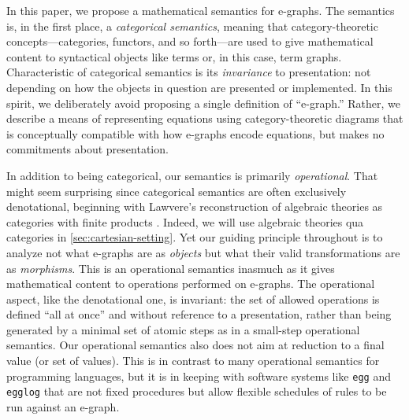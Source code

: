 \documentclass[11pt]{article}
\numberwithin{equation}{section}
\begin{document}
In this paper, we propose a mathematical semantics for e-graphs. The semantics
is, in the first place, a \emph{categorical semantics}, meaning that
category-theoretic concepts---categories, functors, and so forth---are used to
give mathematical content to syntactical objects like terms or, in this case,
term graphs. Characteristic of categorical semantics is its \emph{invariance} to
presentation: not depending on how the objects in question are presented or
implemented. In this spirit, we deliberately avoid proposing a single definition
of ``e-graph.'' Rather, we describe a means of representing equations using
category-theoretic diagrams that is conceptually compatible with how e-graphs
encode equations, but makes no commitments about presentation.

In addition to being categorical, our semantics is primarily \emph{operational}.
That might seem surprising since categorical semantics are often exclusively
denotational, beginning with Lawvere's reconstruction of algebraic theories as
categories with finite products \cite{lawvere1963,crole1993,adamek2011}. Indeed,
we will use algebraic theories qua categories in \cref{sec:cartesian-setting}.
Yet our guiding principle throughout is to analyze not what e-graphs are as
\emph{objects} but what their valid transformations are as \emph{morphisms}.
This is an operational semantics inasmuch as it gives mathematical content to
operations performed on e-graphs. The operational aspect, like the denotational
one, is invariant: the set of allowed operations is defined ``all at once'' and
without reference to a presentation, rather than being generated by a minimal
set of atomic steps as in a small-step operational semantics. Our operational
semantics also does not aim at reduction to a final value (or set of values).
This is in contrast to many operational semantics for programming languages, but
it is in keeping with software systems like \texttt{egg} \cite{willsey2021} and
\texttt{egglog} \cite{zhang2023} that are not fixed procedures but allow
flexible schedules of rules to be run against an e-graph.
\end{document}

